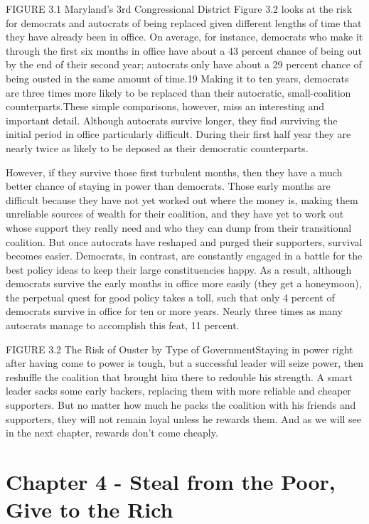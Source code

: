 \documentclass[10pt]{article}
\begin{document}
{\large FIGURE 3.1 Maryland's 3rd Congressional District Figure 3.2 looks at the
risk for democrats and autocrats of being replaced given different lengths of
time that they have already been in office. On average, for instance, democrats
who make it through the first six months in office have about a 43 percent chance
of being out by the end of their second year; autocrats only have about a 29
percent chance of being ousted in the same amount of time.19 Making it to ten
years, democrats are three times more likely to be replaced than their
autocratic, small-coalition counterparts.These simple comparisons, however, miss
an interesting and important detail. Although autocrats survive longer, they find
surviving the initial period in office particularly difficult. During their first
half year they are nearly twice as likely to be deposed as their democratic
counterparts.}

{\large However, if they survive those first turbulent months, then they have a
much better chance of staying in power than democrats. Those early months are
difficult because they have not yet worked out where the money is, making them
unreliable sources of wealth for their coalition, and they have yet to work out
whose support they really need and who they can dump from their transitional
coalition. But once autocrats have reshaped and purged their supporters, survival
becomes easier. Democrats, in contrast, are constantly engaged in a battle for
the best policy ideas to keep their large constituencies happy. As a result,
although democrats survive the early months in office more easily (they get a
honeymoon), the perpetual quest for good policy takes a toll, such that only 4
percent of democrats survive in office for ten or more years. Nearly three times
as many autocrats manage to accomplish this feat, 11 percent.}

{\large FIGURE 3.2 The Risk of Ouster by Type of GovernmentStaying in power
right after having come to power is tough, but a successful leader will seize
power, then reshuffle the coalition that brought him there to redouble his
strength. A smart leader sacks some early backers, replacing them with more
reliable and cheaper supporters. But no matter how much he packs the coalition
with his friends and supporters, they will not remain loyal unless he rewards
them. And as we will see in the next chapter, rewards don't come cheaply.}
\pagebreak{}


\section{Chapter 4 - Steal from the Poor, Give to the Rich}
\end{document}
